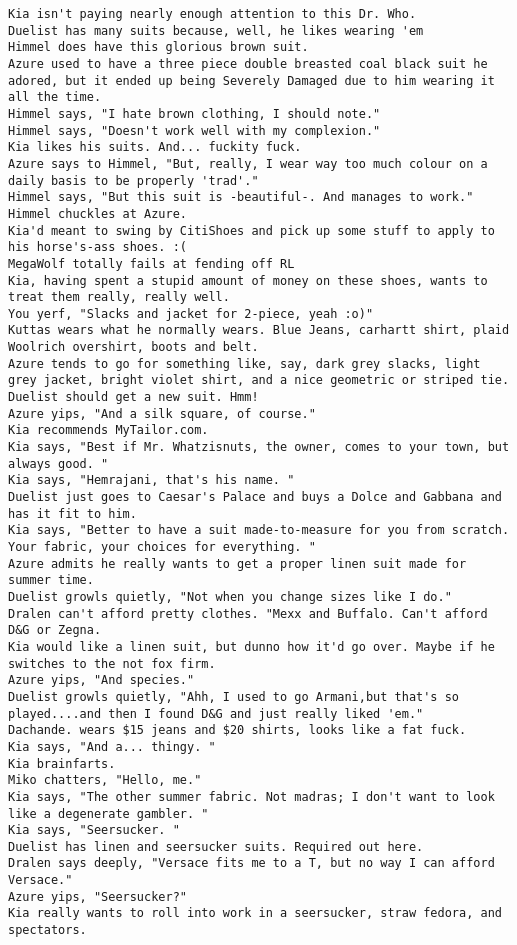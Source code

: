 \begin{verbatim}
Kia isn't paying nearly enough attention to this Dr. Who.
Duelist has many suits because, well, he likes wearing 'em
Himmel does have this glorious brown suit.
Azure used to have a three piece double breasted coal black suit he adored, but it ended up being Severely Damaged due to him wearing it all the time.
Himmel says, "I hate brown clothing, I should note."
Himmel says, "Doesn't work well with my complexion."
Kia likes his suits. And... fuckity fuck.
Azure says to Himmel, "But, really, I wear way too much colour on a daily basis to be properly 'trad'."
Himmel says, "But this suit is -beautiful-. And manages to work."
Himmel chuckles at Azure.
Kia'd meant to swing by CitiShoes and pick up some stuff to apply to his horse's-ass shoes. :(
MegaWolf totally fails at fending off RL
Kia, having spent a stupid amount of money on these shoes, wants to treat them really, really well.
You yerf, "Slacks and jacket for 2-piece, yeah :o)"
Kuttas wears what he normally wears. Blue Jeans, carhartt shirt, plaid Woolrich overshirt, boots and belt.
Azure tends to go for something like, say, dark grey slacks, light grey jacket, bright violet shirt, and a nice geometric or striped tie.
Duelist should get a new suit. Hmm!
Azure yips, "And a silk square, of course."
Kia recommends MyTailor.com.
Kia says, "Best if Mr. Whatzisnuts, the owner, comes to your town, but always good. "
Kia says, "Hemrajani, that's his name. "
Duelist just goes to Caesar's Palace and buys a Dolce and Gabbana and has it fit to him.
Kia says, "Better to have a suit made-to-measure for you from scratch.  Your fabric, your choices for everything. "
Azure admits he really wants to get a proper linen suit made for summer time.
Duelist growls quietly, "Not when you change sizes like I do."
Dralen can't afford pretty clothes. "Mexx and Buffalo. Can't afford D&G or Zegna.
Kia would like a linen suit, but dunno how it'd go over. Maybe if he switches to the not fox firm.
Azure yips, "And species."
Duelist growls quietly, "Ahh, I used to go Armani,but that's so played....and then I found D&G and just really liked 'em."
Dachande. wears $15 jeans and $20 shirts, looks like a fat fuck.
Kia says, "And a... thingy. "
Kia brainfarts.
Miko chatters, "Hello, me."
Kia says, "The other summer fabric. Not madras; I don't want to look like a degenerate gambler. "
Kia says, "Seersucker. "
Duelist has linen and seersucker suits. Required out here.
Dralen says deeply, "Versace fits me to a T, but no way I can afford Versace."
Azure yips, "Seersucker?"
Kia really wants to roll into work in a seersucker, straw fedora, and spectators.

\end{verbatim}
